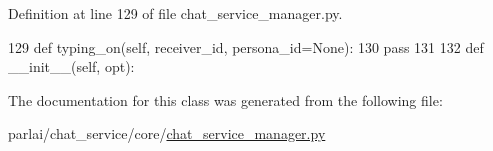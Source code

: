 Definition at line 129 of file chat\+\_\+service\+\_\+manager.\+py.


\begin{DoxyCode}
129         \textcolor{keyword}{def }typing\_on(self, receiver\_id, persona\_id=None):
130             \textcolor{keywordflow}{pass}
131 
132     \textcolor{keyword}{def }\_\_init\_\_(self, opt):
\end{DoxyCode}


The documentation for this class was generated from the following file\+:\begin{DoxyCompactItemize}
\item 
parlai/chat\+\_\+service/core/\hyperlink{chat__service__manager_8py}{chat\+\_\+service\+\_\+manager.\+py}\end{DoxyCompactItemize}
